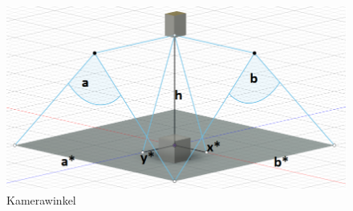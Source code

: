 \begin{figure}[h]
	\centering
	\includegraphics[scale=0.9]{"Grafiken/Kameraformel.png"}
	\caption{Kamerawinkel}
	\label{fig:meine-grafik}
\end{figure}
